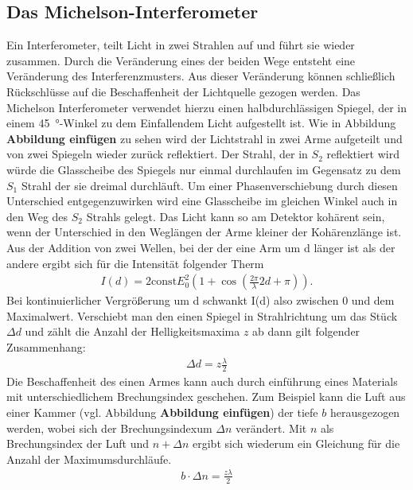 \subsection{Das Michelson-Interferometer}
Ein Interferometer, teilt Licht in zwei Strahlen auf und führt sie wieder zusammen.
Durch die Veränderung eines der beiden Wege entsteht eine Veränderung des Interferenzmusters.
Aus dieser Veränderung können schließlich Rückschlüsse auf die Beschaffenheit der Lichtquelle gezogen werden.
Das Michelson Interferometer verwendet hierzu einen halbdurchlässigen Spiegel, der in einem \qty{45}{\degree}-Winkel 
zu dem Einfallendem Licht aufgestellt ist. 
Wie in Abbildung \textbf{Abbildung einfügen} zu sehen wird der Lichtstrahl in zwei Arme aufgeteilt und von zwei Spiegeln wieder zurück reflektiert.
Der Strahl, der in $S_2$ reflektiert wird würde die Glasscheibe des Spiegels nur einmal durchlaufen im Gegensatz zu dem $S_1$ Strahl
der sie dreimal durchläuft.
Um einer Phasenverschiebung durch diesen Unterschied entgegenzuwirken wird eine Glasscheibe im gleichen Winkel 
auch in den Weg des $S_2$ Strahls gelegt.
Das Licht kann so am Detektor kohärent sein, wenn der Unterschied in den Weglängen der Arme kleiner der Kohärenzlänge ist.
Aus der Addition von zwei Wellen, bei der der eine Arm um d länger ist als der andere ergibt sich für die Intensität folgender Therm
\begin{align}
    I(d) = 2 \text{const} E_0^2 \left(1+ \cos\left(\frac{2\pi}{\lambda} 2d + \pi\right)\right).
\end{align}
Bei kontinuierlicher Vergrößerung um d schwankt I(d) also zwischen 0 und dem Maximalwert.
Verschiebt man den einen Spiegel in Strahlrichtung um das Stück $\Delta d$ und zählt die Anzahl der Helligkeitsmaxima $z$ ab
dann gilt folgender Zusammenhang:
\begin{align}
    \Delta d = z \frac{\lambda}{2}
\end{align} 
Die Beschaffenheit des einen Armes kann auch durch einführung eines Materials mit unterschiedlichem Brechungsindex 
geschehen.
Zum Beispiel kann die Luft aus einer Kammer (vgl. Abbildung \textbf{Abbildung einfügen}) der tiefe $b$ herausgezogen werden,
wobei sich der Brechungsindexum $\Delta n$ verändert.
Mit $n$ als Brechungsindex der Luft und $n + \Delta n$ ergibt sich wiederum ein Gleichung für die Anzahl der Maximumsdurchläufe.
\begin{align}
    b \cdot \Delta n = \frac{z \lambda}{2}
\end{align}

